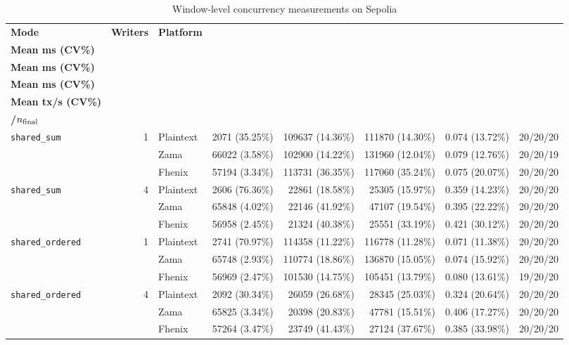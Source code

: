 \begin{table}[!t]
\caption{Window-level concurrency measurements on Sepolia}
\label{tab:concurrency-window-performance}
\centering
\scriptsize
\setlength{\tabcolsep}{3pt}
\begin{tabular}{|l|r|l|r|r|r|r|r|}
\hline
\textbf{Mode} & \textbf{Writers} & \textbf{Platform} & \shortstack{\textbf{Preparation}\\\textbf{Mean ms (CV\%)}} & \shortstack{\textbf{Last receipt}\\\textbf{Mean ms (CV\%)}} & \shortstack{\textbf{Final audit}\\\textbf{Mean ms (CV\%)}} & \shortstack{\textbf{Throughput}\\\textbf{Mean tx/s (CV\%)}} & \shortstack{\textbf{$n_{\rm prep}$/$n_{\rm receipt}$}\\\textbf{/$n_{\rm final}$}} \\
\hline
\texttt{shared\_sum} & 1 & Plaintext & 2071 (35.25\%) & 109637 (14.36\%) & 111870 (14.30\%) & 0.074 (13.72\%) & 20/20/20 \\
 &  & Zama & 66022 (3.58\%) & 102900 (14.22\%) & 131960 (12.04\%) & 0.079 (12.76\%) & 20/20/19 \\
 &  & Fhenix & 57194 (3.34\%) & 113731 (36.35\%) & 117060 (35.24\%) & 0.075 (20.07\%) & 20/20/20 \\
\hline
\texttt{shared\_sum} & 4 & Plaintext & 2606 (76.36\%) & 22861 (18.58\%) & 25305 (15.97\%) & 0.359 (14.23\%) & 20/20/20 \\
 &  & Zama & 65848 (4.02\%) & 22146 (41.92\%) & 47107 (19.54\%) & 0.395 (22.22\%) & 20/20/20 \\
 &  & Fhenix & 56958 (2.45\%) & 21324 (40.38\%) & 25551 (33.19\%) & 0.421 (30.12\%) & 20/20/20 \\
\hline
\texttt{shared\_ordered} & 1 & Plaintext & 2741 (70.97\%) & 114358 (11.22\%) & 116778 (11.28\%) & 0.071 (11.38\%) & 20/20/20 \\
 &  & Zama & 65748 (2.93\%) & 110774 (18.86\%) & 136870 (15.05\%) & 0.074 (15.92\%) & 20/20/20 \\
 &  & Fhenix & 56969 (2.47\%) & 101530 (14.75\%) & 105451 (13.79\%) & 0.080 (13.61\%) & 19/20/20 \\
\hline
\texttt{shared\_ordered} & 4 & Plaintext & 2092 (30.34\%) & 26059 (26.68\%) & 28345 (25.03\%) & 0.324 (20.64\%) & 20/20/20 \\
 &  & Zama & 65825 (3.34\%) & 20398 (20.83\%) & 47781 (15.51\%) & 0.406 (17.27\%) & 20/20/20 \\
 &  & Fhenix & 57264 (3.47\%) & 23749 (41.43\%) & 27124 (37.67\%) & 0.385 (33.98\%) & 20/20/20 \\

\end{tabular}
\end{table}
